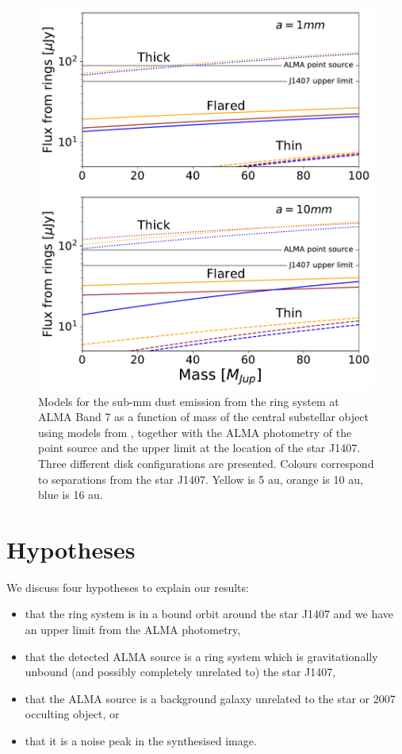 \documentclass[twocolumn]{aa} %
\begin{document}
\begin{figure}[tbh]
\begin{center}
\includegraphics[width=0.75\columnwidth]{free_floating_ring_fluxes_interpolated_2_panel.pdf}
\caption{\label{fig:fluxmodel}Models for the sub-mm dust emission from the ring system at ALMA Band 7 as a function of mass of the central substellar object using models from \citet{Baraffe08}, together with the ALMA photometry of the point source and the upper limit at the location of the star J1407. Three different disk configurations are presented. Colours correspond to separations from the star J1407. Yellow is 5 au, orange is 10 au, blue is 16 au.}
\end{center}
\end{figure}%

\section{Hypotheses}\label{discuss} %

We discuss four hypotheses to explain our results: 
\begin{itemize}
    \item that the ring system is in a bound orbit around the star J1407 and we have an upper limit from the ALMA photometry, 
    \item that the detected ALMA source is a ring system which is gravitationally unbound (and possibly completely unrelated to) the star J1407,
    \item that the ALMA source is a background galaxy unrelated to the star or 2007 occulting object, or
    \item that it is a noise peak in the synthesised image. 
\end{itemize}
\end{document}
